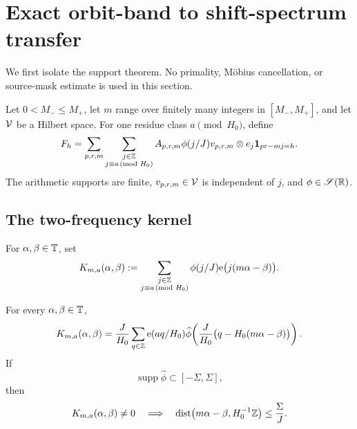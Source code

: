 \section{Exact orbit-band to shift-spectrum transfer}
\label{sec:tpc47-exact-transfer}

We first isolate the support theorem.  No primality, M\"obius
cancellation, or source-mask estimate is used in this section.

Let \(0<M_-\le M_+\), let \(m\) range over finitely many integers in
\([M_-,M_+]\), and let \(\mathcal V\) be a Hilbert space.  For one residue
class \(a\pmod{H_0}\), define
\begin{equation}
 F_h=\sum_{p,r,m}\sum_{\substack{j\in\mathbb Z\\
                    j\equiv a\!\!\pmod{H_0}}}
 A_{p,r,m}\phi(j/J)v_{p,r,m}\otimes e_j
 \mathbf 1_{pr-mj=h}.
 \label{eq:tpc47-bandlimited-packet}
\end{equation}
The arithmetic supports are finite, \(v_{p,r,m}\in\mathcal V\) is
independent of \(j\), and \(\phi\in\mathscr S(\mathbb R)\).

\subsection{The two-frequency kernel}

For \(\alpha,\beta\in\mathbb T\), set
\begin{equation}
 K_{m,a}(\alpha,\beta)
 :=\sum_{\substack{j\in\mathbb Z\\j\equiv a\!\!\pmod{H_0}}}
 \phi(j/J)\mathrm e\bigl(j(m\alpha-\beta)\bigr).
 \label{eq:tpc47-two-frequency-kernel}
\end{equation}

\begin{lemma}
\label{lem:tpc47-progression-Poisson}
For every \(\alpha,\beta\in\mathbb T\),
\begin{equation}
 K_{m,a}(\alpha,\beta)
 =\frac{J}{H_0}\sum_{q\in\mathbb Z}
 \mathrm e(aq/H_0)
 \widehat\phi\!\left(
 \frac{J}{H_0}\bigl(q-H_0(m\alpha-\beta)\bigr)
 \right).
 \label{eq:tpc47-progression-Poisson}
\end{equation}
If
\begin{equation}
 \operatorname{supp}\widehat\phi\subset[-\Sigma,\Sigma],
 \label{eq:tpc47-profile-bandlimit}
\end{equation}
then
\begin{equation}
 K_{m,a}(\alpha,\beta)\ne0
 \quad\Longrightarrow\quad
 \operatorname{dist}
 \bigl(m\alpha-\beta,H_0^{-1}\mathbb Z\bigr)
 \le\frac{\Sigma}{J}.
 \label{eq:tpc47-kernel-support-condition}
\end{equation}
\end{lemma}

